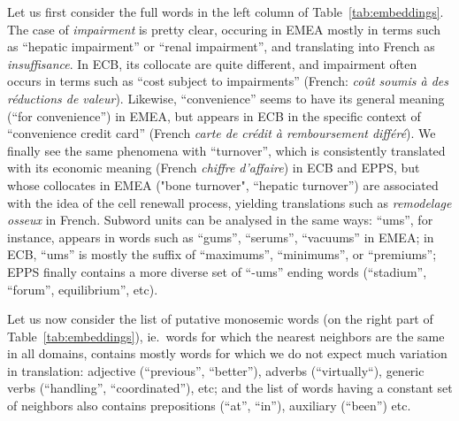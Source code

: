 \documentclass[11pt,a4paper]{article}
\begin{document}
Let us first consider the full words in the left column of Table~\ref{tab:embeddings}. The case of \emph{impairment} is pretty clear, occuring in EMEA mostly in terms such as ``hepatic impairment'' or ``renal impairment'', and translating into French as \textsl{insuffisance}. In ECB, its collocate are quite different, and impairment often occurs in terms such as ``cost subject to impairments'' (French: \emph{co\^ut soumis \`a des r\'eductions de valeur}). Likewise, ``convenience'' seems to have its general meaning (``for convenience'') in EMEA, but appears in ECB in the specific context of ``convenience credit card'' (French \textsl{carte de cr\' edit \`a remboursement diff\'er\'e}). We finally see the same phenomena with ``turnover'', which is consistently translated with its economic meaning (French \textsl{chiffre d'affaire}) in ECB and EPPS, but whose collocates in EMEA ("bone turnover", ``hepatic turnover'') are associated with the idea of the cell renewall process, yielding translations such as \textsl{remodelage osseux} in French. Subword units can be analysed in the same ways: ``ums'', for instance, appears in words such as ``gums'', ``serums'', ``vacuums''  in EMEA; in ECB, ``ums'' is mostly the suffix of ``maximums'', ``minimums'', or ``premiums''; EPPS finally contains a more diverse set of ``-ums'' ending words (``stadium'', ``forum'', equilibrium'', etc). 

Let us now consider the list of putative monosemic words (on the right part of Table~\ref{tab:embeddings}), ie.\ words for which the nearest neighbors are the same in all domains, contains mostly words for which we do not expect much variation in translation: adjective (``previous'', ``better''), adverbs (``virtually``), generic verbs (``handling'', ``coordinated''), etc; and the list of words having a constant set of neighbors also contains prepositions (``at'', ``in''), auxiliary (``been'') etc.  
\end{document}

